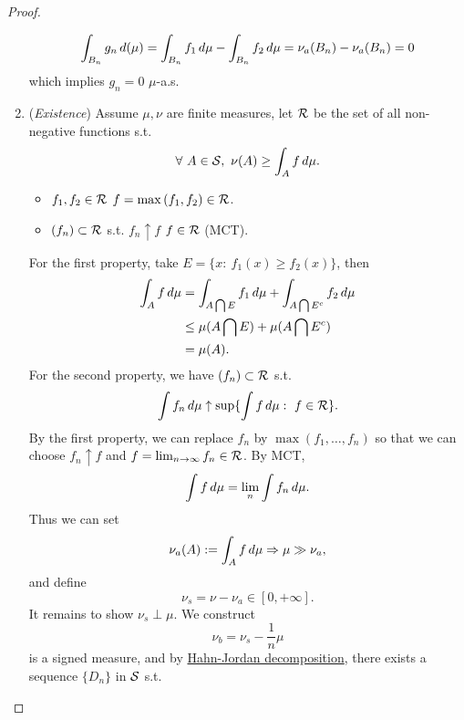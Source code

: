 \begin{proof}
\begin{enumerate}
\begin{equation*}
        \int_{B_n} g_n \,d(\mu) = \int_{B_n} f_1 \,d\mu - \int_{B_n} f_2 \,d\mu = \nu_a(B_n) - \nu_a(B_n)= 0
    \end{equation*}
    which implies $g_n = 0$ $\mu$-a.s.
    \item (\textit{Existence}) Assume $\mu, \nu$ are finite measures, let $\mathcal{R}$ be the set of all non-negative functions s.t.
    \begin{equation*}
        \forall\ A \in \mathcal{S},\ \nu(A) \geq \int_A f \,d\mu.
    \end{equation*}
    \begin{itemize}
        \item $f_1,f_2 \in \mathcal{R}$ \imply $f = \max{(f_1, f_2)} \in \mathcal{R}$.
        \item $(f_n) \subset \mathcal{R}$ s.t. $f_n \uparrow f$ \imply $f \in \mathcal{R}$ (MCT).
    \end{itemize}
    For the first property, take $E = \{x:\ f_1(x) \geq f_2(x)\}$, then
    \begin{align*}
        \int_A f \,d\mu &= \int_{A \bigcap E} f_1 \,d\mu + \int_{A \bigcap E^c} f_2 \,d\mu\\
        &\leq \mu(A \bigcap E) + \mu(A \bigcap E^c)\\
        &= \mu(A).
    \end{align*}
    For the second property, we have $(f_n) \subset \mathcal{R}$ s.t.
    \begin{equation*}
        \int f_n \dr \mu \uparrow \sup\{\int f \dr \mu:\ f \in \Rs\}.
    \end{equation*}
    By the first property, we can replace $f_n$ by $\max{(f_1,\dots,f_n)}$ so that we can choose $f_n \uparrow f$ and $f = \lim_{n \to \infty} f_n \in \mathcal{R}$. By MCT,
    \begin{equation*}
        \int f \,d\mu = \lim_n \int f_n \,d\mu.
    \end{equation*}
    Thus we can set
    \begin{equation*}
        \nu_a(A) := \int_A f \,d\mu \Rightarrow \mu \gg \nu_a,
    \end{equation*}
    and define 
    \begin{equation*}
        \nu_s = \nu - \nu_a \in [0, +\infty].
    \end{equation*}
    It remains to show \underline{$\nu_s \perp \mu$}. We construct
    \begin{equation*}
        \nu_b = \nu_s - \frac{1}{n} \mu
    \end{equation*}
    is a signed measure, and by \hyperref[HJ decomposition]{Hahn-Jordan decomposition}, there exists a sequence $\{D_n\}$ in $\mathcal{S}$ s.t.

\end{enumerate}
\end{proof}
